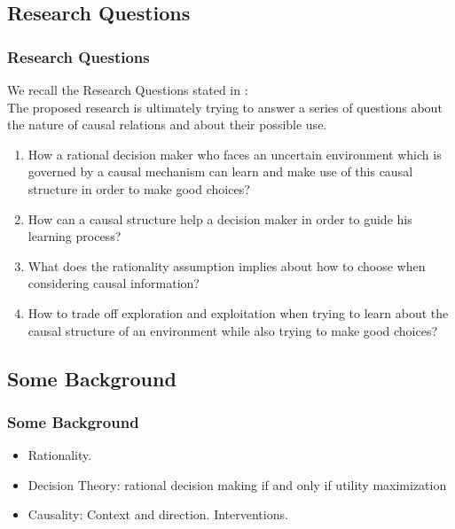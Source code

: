 \documentclass{beamer}
\theoremstyle{plain}
\begin{document}
\subsection{Research Questions}
\begin{frame}
\frametitle{Research Questions}
We recall the Research Questions stated in \cite{gonzalez2019causal}:\\
The proposed research is ultimately trying to answer a series of questions about the nature of causal relations and about their possible use.
\begin{enumerate}
\item How a rational decision maker who faces an uncertain environment which is governed by a causal mechanism can learn and make use of this causal structure in order to make good choices? \item How can a causal structure help a decision maker in order to guide his learning process? 
\item What does the rationality assumption implies about how to choose when considering causal information? 
\item How to trade off exploration and exploitation when trying to learn about the causal structure of an environment while also trying to make good choices?
\end{enumerate}
\end{frame}


\subsection{Some Background}
\begin{frame}
\frametitle{Some Background}
\begin{itemize}
\item Rationality.
\item Decision Theory: rational decision making if and only if utility maximization
\item Causality: Context and direction. Interventions. 
\end{itemize}
\end{frame}
\end{document}

